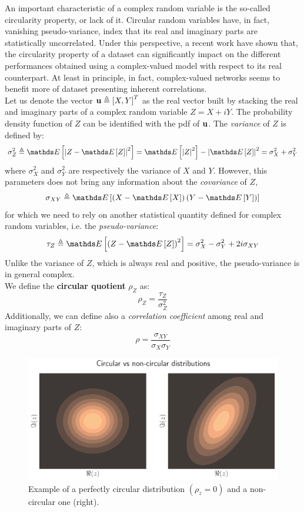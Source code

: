 \documentclass[../main.tex]{subfiles}
\begin{document}
An important characteristic of a complex random
variable is the so-called circularity property, or lack of it. Circular random variables have, in fact, vanishing pseudo-variance, index that its real and imaginary parts are statistically uncorrelated. Under this perspective, a recent work \cite{barrachina2021complexvalued} have shown that, the circularity property of a dataset can significantly impact on the different performances obtained using a complex-valued model with respect to its real counterpart. At least in principle, in fact, complex-valued networks seems to benefit more of dataset presenting inherent correlations.\\
Let us denote the vector $\vb{u}\triangleq \left[X,Y\right]^T$ as the real vector built by stacking the real and imaginary parts of a complex random variable $Z = X+iY$. The probability density function of $Z$ can be identified with the pdf of $\vb{u}$. The \textit{variance} of $Z$ is defined by:
\[ \sigma^2_Z \triangleq \Ev{\abs{Z-\Ev{Z}}^2} = \Ev{\abs{Z}^2} - \abs{\Ev{Z}}^2 = \sigma^2_X + \sigma^2_Y \]
where $\sigma^2_X$ and $\sigma^2_Y$ are respectively the variance of $X$ and $Y$. However, this parameters does not bring any information about the \textit{covariance} of $Z$,
\[ \sigma_{XY} \triangleq \Ev{\left(X-\Ev{X}\right)\left(Y-\Ev{Y}\right)} \]
for which we need to rely on another statistical quantity defined for complex random variables, i.e. the \textit{pseudo-variance}:
\[ \tau_Z\triangleq \Ev{\left(Z-\Ev{Z}\right)^2} = \sigma^2_{X} - \sigma^2_Y + 2i\sigma_{XY} \]
Unlike the variance of $Z$, which is always real and positive, the pseudo-variance is in general complex.\\
We define the \textbf{circular quotient} $\rho_Z$ as:
\[ \rho_Z = \frac{\tau_Z}{\sigma^2_Z} \]
Additionally, we can define also a \textit{correlation coefficient} among real and imaginary parts of $Z$:
\[ \rho = \frac{\sigma_{XY}}{\sigma_X\sigma_Y} \]
\begin{figure}
	\centering
	\includegraphics[scale=0.5]{pictures/std_cmplx_norm_distrib}
	\caption{Example of a perfectly circular distribution $(\rho_z=0)$ and a non-circular one (right).}
	\label{fig:circular_distrib}
\end{figure} 
\end{document}

